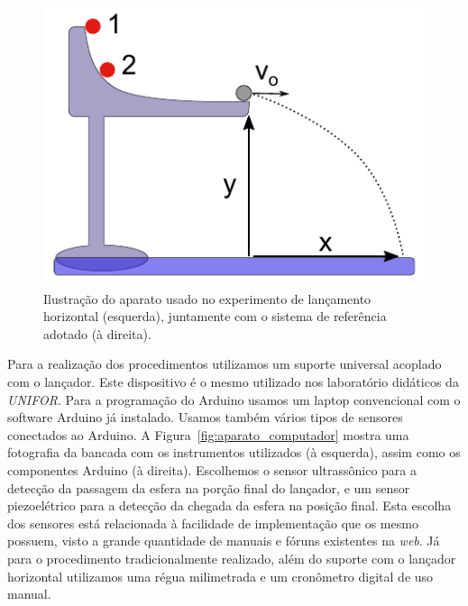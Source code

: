\documentclass[11pt,a4paper]{article}
\begin{document}
\begin{figure}[!hbt]
\centering
\includegraphics[scale=0.6]{figs/lancamento_suporte.pdf}
\caption{Ilustração do aparato usado no experimento de lançamento horizontal (esquerda), juntamente com o sistema de referência adotado (à direita).}
\label{fig:desenho_lancador}
\end{figure}


Para a realização dos procedimentos utilizamos um suporte universal acoplado com o lançador.
Este dispositivo é o mesmo utilizado nos laboratório didáticos da \emph{UNIFOR}.
Para a programação do Arduino usamos um laptop convencional com o software Arduino já instalado.
Usamos também vários tipos de sensores conectados ao Arduino.
A Figura~\ref{fig:aparato_computador} mostra uma fotografia da bancada com os instrumentos utilizados (à esquerda), assim como os componentes Arduino (à direita).
Escolhemos o sensor ultrassônico para a detecção da passagem da esfera na porção final do lançador, e um sensor piezoelétrico para a detecção da chegada da esfera na posição final. Esta escolha dos sensores está relacionada à facilidade de implementação que os mesmo possuem, visto a grande quantidade de manuais e fóruns existentes na \textit{web}.
Já para o procedimento tradicionalmente realizado, além do suporte com o lançador horizontal utilizamos uma régua milimetrada e um cronômetro digital de uso manual.
\end{document}

